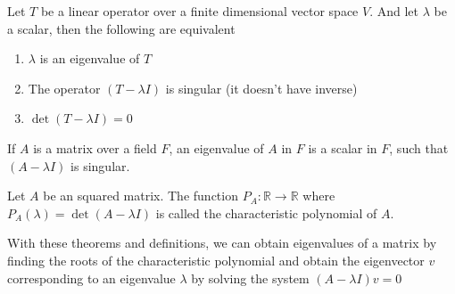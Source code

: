 \documentclass{report}
\begin{document}
    \begin{thBox}
        Let $T$ be a linear operator over a finite dimensional vector space $V$. And let $\lambda$ be a scalar, then the following are equivalent

        \begin{enumerate}
            \item $\lambda$ is an eigenvalue of $T$
            \item The operator $(T - \lambda I)$ is singular (it doesn't have inverse)
            \item $\det(T-\lambda I) = 0$
        \end{enumerate}
    \end{thBox}

    \begin{defBox}
        If $A$ is a matrix over a field $F$, an eigenvalue of $A$ in $F$ is a scalar in $F$, such that $(A - \lambda I)$ is singular.
    \end{defBox}

    \begin{defBox}
        Let $A$ be an squared matrix. The function $P_A: \mathbb{R} \to \mathbb{R}$ where $P_A(\lambda) = \det(A - \lambda I)$ is called the characteristic polynomial of $A$.
    \end{defBox}

    With these theorems and definitions, we can obtain eigenvalues of a matrix by finding the roots of the characteristic polynomial and obtain the eigenvector $v$ corresponding to an eigenvalue $\lambda$ by solving the system $(A-\lambda I)v = 0$
\end{document}
